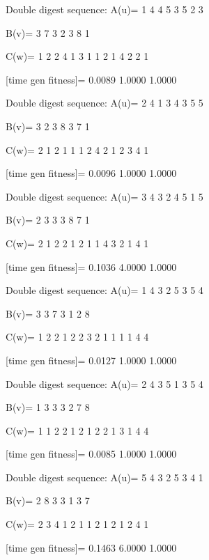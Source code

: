 Double digest sequence:
A(u)=
     1     4     4     5     3     5     2     3

B(v)=
     3     7     3     2     3     8     1

C(w)=
     1     2     2     4     1     3     1     1     2     1     4     2     2     1

[time gen fitness]=
    0.0089    1.0000    1.0000

Double digest sequence:
A(u)=
     2     4     1     3     4     3     5     5

B(v)=
     3     2     3     8     3     7     1

C(w)=
     2     1     2     1     1     1     2     4     2     1     2     3     4     1

[time gen fitness]=
    0.0096    1.0000    1.0000

Double digest sequence:
A(u)=
     3     4     3     2     4     5     1     5

B(v)=
     2     3     3     3     8     7     1

C(w)=
     2     1     2     2     1     2     1     1     4     3     2     1     4     1

[time gen fitness]=
    0.1036    4.0000    1.0000

Double digest sequence:
A(u)=
     1     4     3     2     5     3     5     4

B(v)=
     3     3     7     3     1     2     8

C(w)=
     1     2     2     1     2     2     3     2     1     1     1     1     4     4

[time gen fitness]=
    0.0127    1.0000    1.0000

Double digest sequence:
A(u)=
     2     4     3     5     1     3     5     4

B(v)=
     1     3     3     3     2     7     8

C(w)=
     1     1     2     2     1     2     1     2     2     1     3     1     4     4

[time gen fitness]=
    0.0085    1.0000    1.0000

Double digest sequence:
A(u)=
     5     4     3     2     5     3     4     1

B(v)=
     2     8     3     3     1     3     7

C(w)=
     2     3     4     1     2     1     1     2     1     2     1     2     4     1

[time gen fitness]=
    0.1463    6.0000    1.0000

